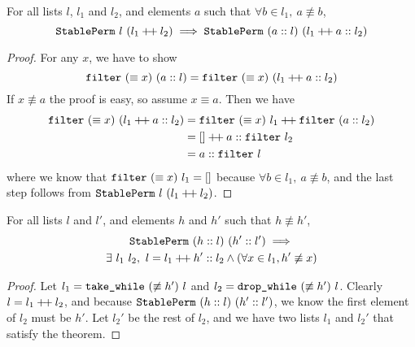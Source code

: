 \documentclass[sigplan,10pt,anonymous,review]{thesis}
\begin{document}
\begin{lemma}
  For all lists $l$, $l_1$ and $l_2$, and elements $a$ such that $\forall b
  \in l_1,~a \not\equiv b$,
  \begin{equation*}
    \texttt{\textup{StablePerm}}~l~(l_1 \mathbin{+\mkern-3mu+} l_2) \implies \texttt{\textup{StablePerm}}~(a
    :: l)~(l_1 \mathbin{+\mkern-3mu+} a :: l_2)
  \end{equation*}
\end{lemma}
\begin{proof}
  For any $x$, we have to show
  \begin{equation*}
    \texttt{\textup{filter}}~(\equiv x)~(a::l) = \texttt{\textup{filter}}~(\equiv x)~(l_1 \mathbin{+\mkern-3mu+} a :: l_2)
  \end{equation*}
  If $x \not\equiv a$ the proof is easy, so assume $x \equiv a$. Then we have
  \begin{align*}
    \texttt{\textup{filter}}~(\equiv x)~(l_1 \mathbin{+\mkern-3mu+} a :: l_2)
    &= \texttt{\textup{filter}}~(\equiv x)~l_1 \mathbin{+\mkern-3mu+} \texttt{\textup{filter}}~(a :: l_2) \\
    &= [] \mathbin{+\mkern-3mu+} a::\texttt{\textup{filter}}~l_2 \\
    &= a::\texttt{\textup{filter}}~l
  \end{align*}
  where we know that $\texttt{\textup{filter}}~(\equiv x)~l_1 = []$ because $\forall b \in
  l_1,~a \not\equiv b$, and the last step follows from
  $\texttt{\textup{StablePerm}}~l~(l_1 \mathbin{+\mkern-3mu+} l_2)$.
\end{proof}

\begin{theorem}
  For all lists $l$ and $l'$, and elements $h$ and $h'$ such that $h
  \not\equiv h'$,
  \begin{gather*}
    \texttt{\textup{StablePerm}}~(h :: l)~(h' :: l') \implies \\
    \exists~l_1~l_2, ~l = l_1 \mathbin{+\mkern-3mu+} h' :: l_2 \land (\forall x \in l_1, h' \not\equiv x)
  \end{gather*}
\end{theorem}
\begin{proof}
  Let $l_1 = \texttt{\textup{take\_while}}~(\not\equiv h')~l$ and $l_2 =
  \texttt{\textup{drop\_while}}~(\not\equiv h')~l$. Clearly $l = l_1 \mathbin{+\mkern-3mu+} l_2$, and
  because $\texttt{\textup{StablePerm}}~(h :: l)~(h' :: l')$, we know the first
  element of $l_2$ must be $h'$. Let $l_2'$ be the rest of $l_2$, and
  we have two lists $l_1$ and $l_2'$ that satisfy the theorem.
\end{proof}
\end{document}
